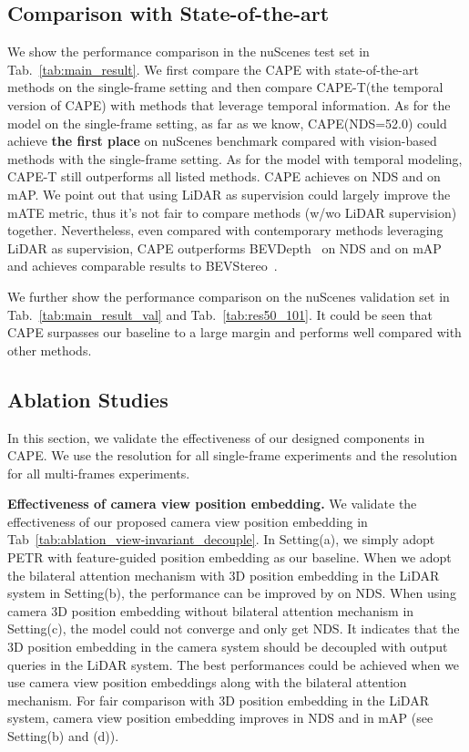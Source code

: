 \documentclass[10pt,twocolumn,letterpaper]{article}
\newcommand{\ourMethod}{CAPE}
\newcommand{\highNDS}{}
\newcommand{\highmAP}{}
\begin{document}
\subsection{Comparison with State-of-the-art}
We show the performance comparison in the nuScenes test set in Tab.~\ref{tab:main_result}. We first compare the \ourMethod{} with state-of-the-art methods on the single-frame setting and then compare \ourMethod{}-T(the temporal version of \ourMethod{}) with methods that leverage temporal information. 
As for the model on the single-frame setting, as far as we know, \ourMethod{}(NDS=52.0) could achieve \textbf{the first place} on nuScenes benchmark compared with vision-based methods with the single-frame setting.
As for the model with temporal modeling, \ourMethod{}-T still outperforms all listed methods. \ourMethod{} achieves \highNDS{} on NDS and \highmAP{} on mAP. We point out that using LiDAR as supervision could largely improve the mATE metric, thus it's not fair to compare methods (w/wo LiDAR supervision) together. Nevertheless, even compared with contemporary methods leveraging LiDAR as supervision, \ourMethod{} outperforms BEVDepth~\cite{li2022bevdepth}  on NDS and  on mAP and achieves comparable results to BEVStereo~\cite{li2022bevstereo}. 


We further show the performance comparison on the nuScenes validation set in Tab.~\ref{tab:main_result_val} and Tab.~\ref{tab:res50_101}. It could be seen that \ourMethod{} surpasses our baseline to a large margin and performs well compared with other methods. 


\subsection{Ablation Studies} In this section, we validate the effectiveness of our designed components in \ourMethod{}.
We use the  resolution for all single-frame experiments and the  resolution for all multi-frames experiments.





\vspace{2mm}
\noindent\textbf{Effectiveness of camera view position embedding.} We validate the effectiveness of our proposed camera view position embedding in Tab~\ref{tab:ablation_view-invariant_decouple}. In Setting(a), we simply adopt PETR with feature-guided position embedding as our baseline. When we adopt the bilateral attention mechanism with 3D position embedding in the LiDAR system in Setting(b), the performance can be improved by  on NDS. When using camera 3D position embedding without bilateral attention mechanism in Setting(c), the model could not converge and only get  NDS. It indicates that the 3D position embedding in the camera system should be decoupled with output queries in the LiDAR system. The best performances could be achieved when we use camera view position embeddings along with the bilateral attention mechanism.
For fair comparison with 3D position embedding in the LiDAR system, camera view position embedding improves  in NDS and  in mAP (see Setting(b) and (d)).
\end{document}

